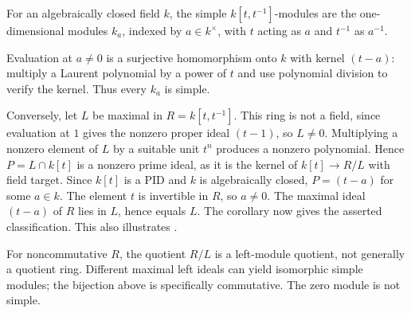 \begin{example}\label{ex-laurent-simple-modules}
For an algebraically closed field $k$, the simple $k[t,t^{-1}]$-modules are the one-dimensional modules $k_a$, indexed by $a\in k^\times$, with $t$ acting as $a$ and $t^{-1}$ as $a^{-1}$.

Evaluation at $a\ne0$ is a surjective homomorphism onto $k$ with kernel $(t-a)$: multiply a Laurent polynomial by a power of $t$ and use polynomial division to verify the kernel. Thus every $k_a$ is simple.

Conversely, let $L$ be maximal in $R=k[t,t^{-1}]$. This ring is not a field, since evaluation at $1$ gives the nonzero proper ideal $(t-1)$, so $L\ne0$. Multiplying a nonzero element of $L$ by a suitable unit $t^n$ produces a nonzero polynomial. Hence $P=L\cap k[t]$ is a nonzero prime ideal, as it is the kernel of $k[t]\to R/L$ with field target. Since $k[t]$ is a PID and $k$ is algebraically closed, $P=(t-a)$ for some $a\in k$. The element $t$ is invertible in $R$, so $a\ne0$. The maximal ideal $(t-a)$ of $R$ lies in $L$, hence equals $L$. The corollary now gives the asserted classification. This also illustrates .
\end{example}

\begin{remark}\label{remark-simple-noncommutative-scope}
For noncommutative $R$, the quotient $R/L$ is a left-module quotient, not generally a quotient ring. Different maximal left ideals can yield isomorphic simple modules; the bijection above is specifically commutative. The zero module is not simple.
\end{remark}
